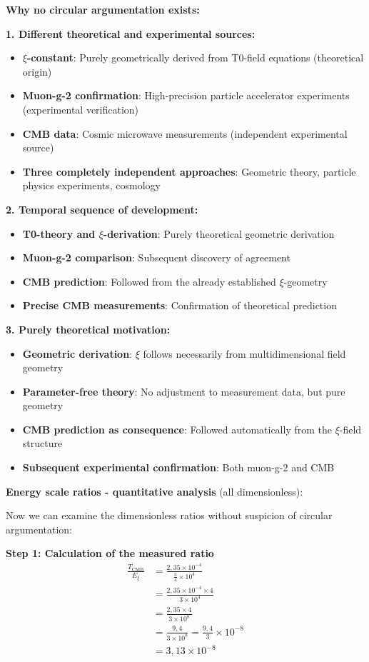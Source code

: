 \documentclass[12pt,a4paper]{article}
\begin{document}
	\textbf{Why no circular argumentation exists:}
	
	\textbf{1. Different theoretical and experimental sources:}
	\begin{itemize}
		\item \textbf{$\xi$-constant}: Purely geometrically derived from T0-field equations (theoretical origin)
		\item \textbf{Muon-g-2 confirmation}: High-precision particle accelerator experiments (experimental verification)
		\item \textbf{CMB data}: Cosmic microwave measurements (independent experimental source)
		\item \textbf{Three completely independent approaches}: Geometric theory, particle physics experiments, cosmology
	\end{itemize}
	
	\textbf{2. Temporal sequence of development:}
	\begin{itemize}
		\item \textbf{T0-theory and $\xi$-derivation}: Purely theoretical geometric derivation
		\item \textbf{Muon-g-2 comparison}: Subsequent discovery of agreement 
		\item \textbf{CMB prediction}: Followed from the already established $\xi$-geometry
		\item \textbf{Precise CMB measurements}: Confirmation of theoretical prediction
	\end{itemize}
	
	\textbf{3. Purely theoretical motivation:}
	\begin{itemize}
		\item \textbf{Geometric derivation}: $\xi$ follows necessarily from multidimensional field geometry
		\item \textbf{Parameter-free theory}: No adjustment to measurement data, but pure geometry
		\item \textbf{CMB prediction as consequence}: Followed automatically from the $\xi$-field structure
		\item \textbf{Subsequent experimental confirmation}: Both muon-g-2 and CMB
	\end{itemize}
	
	\textbf{Energy scale ratios - quantitative analysis} (all dimensionless):
	
	Now we can examine the dimensionless ratios without suspicion of circular argumentation:
	
	\textbf{Step 1: Calculation of the measured ratio}
	\begin{align}
		\frac{T_{\text{CMB}}}{E_\xi} &= \frac{2{,}35 \times 10^{-4}}{\frac{3}{4} \times 10^4} \\
		&= \frac{2{,}35 \times 10^{-4} \times 4}{3 \times 10^4} \\
		&= \frac{2{,}35 \times 4}{3 \times 10^8} \\
		&= \frac{9{,}4}{3 \times 10^8} = \frac{9{,}4}{3} \times 10^{-8} \\
		&= 3{,}13 \times 10^{-8}
	\end{align}
	
\end{document}

